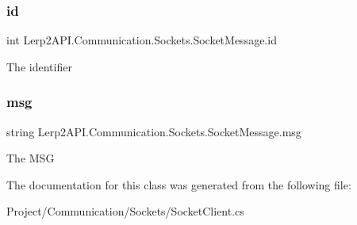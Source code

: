 \subsubsection{\texorpdfstring{id}{id}}
{\footnotesize\ttfamily int Lerp2\+A\+P\+I.\+Communication.\+Sockets.\+Socket\+Message.\+id}



The identifier 

\mbox{\label{class_lerp2_a_p_i_1_1_communication_1_1_sockets_1_1_socket_message_a5709cbeaa3cbb5e6e752d240b8f73f9b}} 
\subsubsection{\texorpdfstring{msg}{msg}}
{\footnotesize\ttfamily string Lerp2\+A\+P\+I.\+Communication.\+Sockets.\+Socket\+Message.\+msg}



The M\+SG 



The documentation for this class was generated from the following file\+:\begin{DoxyCompactItemize}
\item 
Project/\+Communication/\+Sockets/Socket\+Client.\+cs\end{DoxyCompactItemize}
